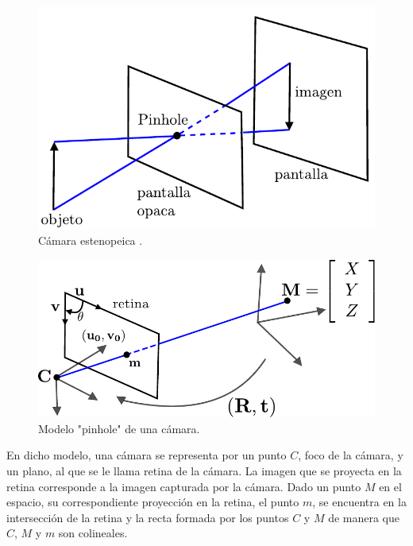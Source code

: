 \begin{figure}[h!]
\begin{center}
\includegraphics[scale=0.5]{img/calibracion/pinhole_camara}
\end{center}
\caption{Cámara estenopeica .\cite{faugeras_libro}}
\label{pinhole_camara}
\end{figure}



\begin{figure}[ht]
\begin{center}
\includegraphics[scale=0.7]{img/calibracion/pinhole_modelo}
\end{center}
\caption{Modelo "pinhole" de una cámara.\cite{zhang_libro}}
\label{pinhole_modelo}
\end{figure}

En dicho modelo, una cámara se representa por un punto $C$, foco de la cámara, y un plano, al  que se le llama retina de la cámara. La imagen que se proyecta en la retina corresponde a la imagen capturada por la cámara. Dado un punto $M$ en el espacio, su correspondiente proyección en la retina, el punto $m$, se encuentra en la intersección de la retina y la recta formada por los puntos $C$ y $M$ de manera que $C$, $M$ y $m$ son colineales.\\ 




